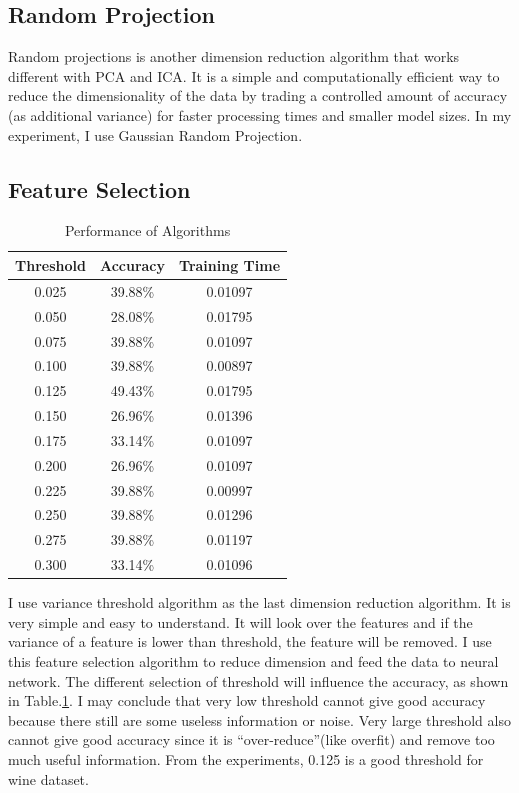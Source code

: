 \documentclass[11pt]{article}
\begin{document}
\subsection{Random Projection}
Random projections is another dimension reduction algorithm that works different with PCA and ICA. It is a simple and computationally efficient way to reduce the dimensionality of the data by trading a controlled amount of accuracy (as additional variance) for faster processing times and smaller model sizes. In my experiment, I use Gaussian Random Projection.
\subsection{Feature Selection}
\begin{table}[h!]
  \begin{center}
    \caption{Performance of Algorithms}
    \label{tab:wine_fs}
    \begin{tabular}{c|c|c}
      \textbf{Threshold} & \textbf{Accuracy} & \textbf{Training Time}\\
      \hline
      0.025 & 39.88\% & 0.01097 \\
      0.050 & 28.08\% & 0.01795\\
      0.075 & 39.88\% & 0.01097\\
      0.100 & 39.88\% & 0.00897\\
      0.125 & 49.43\% & 0.01795\\
      0.150 & 26.96\% & 0.01396\\
      0.175 & 33.14\% & 0.01097\\
      0.200 & 26.96\% & 0.01097\\
      0.225 & 39.88\% & 0.00997\\
      0.250 & 39.88\% & 0.01296\\
      0.275 & 39.88\% & 0.01197\\
      0.300 & 33.14\% & 0.01096\\
    \end{tabular}
  \end{center}
\end{table}
I use variance threshold algorithm as the last dimension reduction algorithm. It is very simple and easy to understand. It will look over the features and if the variance of a feature is lower than threshold, the feature will be removed. I use this feature selection algorithm to reduce dimension and feed the data to neural network. The different selection of threshold will influence the accuracy, as shown in Table.\ref{tab:wine_fs}. I may conclude that very low threshold cannot give good accuracy because there still are some useless information or noise. Very large threshold also cannot give good accuracy since it is ``over-reduce''(like overfit) and remove too much useful information. From the experiments, 0.125 is a good threshold for wine dataset.
\end{document}
